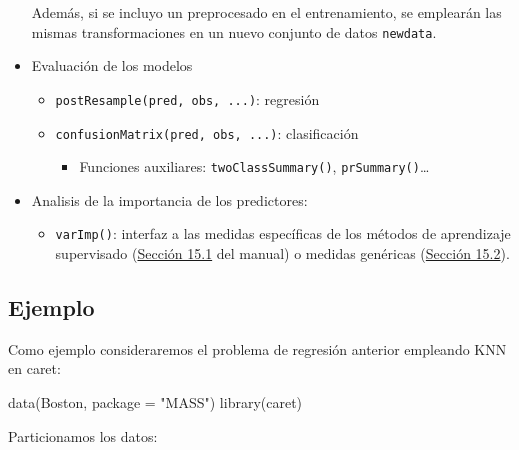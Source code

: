 \documentclass[
  spanish,
]{book}
\newenvironment{Shaded}{\begin{snugshade}}{\end{snugshade}}
\newcommand{\AttributeTok}[1]{\textcolor[rgb]{0.77,0.63,0.00}{#1}}
\newcommand{\ConstantTok}[1]{\textcolor[rgb]{0.00,0.00,0.00}{#1}}
\newcommand{\DecValTok}[1]{\textcolor[rgb]{0.00,0.00,0.81}{#1}}
\newcommand{\FloatTok}[1]{\textcolor[rgb]{0.00,0.00,0.81}{#1}}
\newcommand{\FunctionTok}[1]{\textcolor[rgb]{0.00,0.00,0.00}{#1}}
\newcommand{\NormalTok}[1]{#1}
\newcommand{\OtherTok}[1]{\textcolor[rgb]{0.56,0.35,0.01}{#1}}
\newcommand{\SpecialCharTok}[1]{\textcolor[rgb]{0.00,0.00,0.00}{#1}}
\newcommand{\StringTok}[1]{\textcolor[rgb]{0.31,0.60,0.02}{#1}}
\providecommand{\tightlist}{%
  \setlength{\itemsep}{0pt}\setlength{\parskip}{0pt}}
\theoremstyle{break}
\theoremstyle{definition}
\theoremstyle{definition}
\theoremstyle{definition}
\theoremstyle{definition}
\theoremstyle{remark}
\begin{document}
\begin{itemize}
  Además, si se incluyo un preprocesado en el entrenamiento, se emplearán las mismas transformaciones en un nuevo conjunto de datos \texttt{newdata}.
\item
  Evaluación de los modelos

  \begin{itemize}
  \item
    \texttt{postResample(pred,\ obs,\ ...)}: regresión
  \item
    \texttt{confusionMatrix(pred,\ obs,\ ...)}: clasificación

    \begin{itemize}
    \tightlist
    \item
      Funciones auxiliares: \texttt{twoClassSummary()}, \texttt{prSummary()}\ldots{}
    \end{itemize}
  \end{itemize}
\item
  Analisis de la importancia de los predictores:

  \begin{itemize}
  \tightlist
  \item
    \texttt{varImp()}: interfaz a las medidas específicas de los métodos de aprendizaje supervisado (\href{https://topepo.github.io/caret/variable-importance.html\#model-specific-metrics}{Sección 15.1} del manual) o medidas genéricas (\href{https://topepo.github.io/caret/variable-importance.html\#model-independent-metrics}{Sección 15.2}).
  \end{itemize}
\end{itemize}

\hypertarget{ejemplo}{%
\subsection{Ejemplo}\label{ejemplo}}

Como ejemplo consideraremos el problema de regresión anterior empleando KNN en caret:

\begin{Shaded}
\begin{Highlighting}[]
\FunctionTok{data}\NormalTok{(Boston, }\AttributeTok{package =} \StringTok{"MASS"}\NormalTok{)}
\FunctionTok{library}\NormalTok{(caret)}
\end{Highlighting}
\end{Shaded}

Particionamos los datos:

\begin{Shaded}
\end{Shaded}
\end{document}

